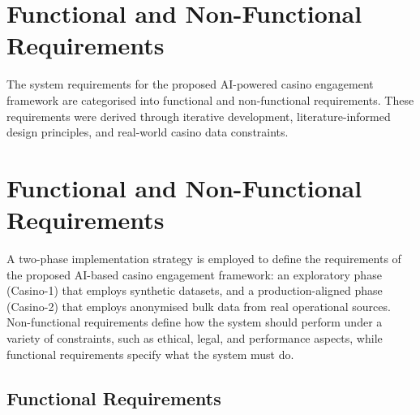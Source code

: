 \documentclass[12pt,a4paper]{report}
\begin{document}
\section{Functional and Non-Functional Requirements}

The system requirements for the proposed AI-powered casino engagement framework are categorised into functional and non-functional requirements. These requirements were derived through iterative development, literature-informed design principles, and real-world casino data constraints.

\section{Functional and Non-Functional Requirements}

A two-phase implementation strategy is employed to define the requirements of the proposed AI-based casino engagement framework: an exploratory phase (Casino-1) that employs synthetic datasets, and a production-aligned phase (Casino-2) that employs anonymised bulk data from real operational sources.  Non-functional requirements define how the system should perform under a variety of constraints, such as ethical, legal, and performance aspects, while functional requirements specify what the system must do.

\subsection{Functional Requirements}
\end{document}
